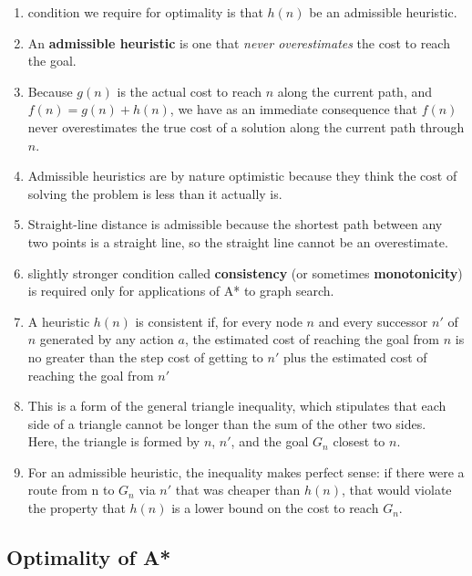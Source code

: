 \begin{enumerate}
    \item condition we require for optimality is that $h(n)$ be an admissible heuristic.

    \item An \textbf{admissible heuristic} is one that \textit{never overestimates} the cost to reach the goal.
    
    \item Because $g(n)$ is the actual cost to reach $n$ along the current path, and $f(n) = g(n) + h(n)$, we have as an immediate consequence that $f(n)$ never overestimates the true cost of a solution along the current path through $n$.

    \item Admissible heuristics are by nature optimistic because they think the cost of solving the problem is less than it actually is.

    \item Straight-line distance is admissible because the shortest path between any two points is a straight line, so the straight line cannot be an overestimate.

    \item slightly stronger condition called \textbf{consistency} (or sometimes \textbf{monotonicity}) is required only for applications of A* to graph search.

    \item A heuristic $h(n)$ is consistent if, for every node $n$ and every successor $n'$ of $n$ generated by any action $a$, the estimated cost of reaching the goal from $n$ is no greater than the step cost of getting to $n'$ plus the estimated cost of reaching the goal from $n'$

    \item This is a form of the general triangle inequality, which stipulates that each side of a triangle cannot be longer than the sum of the other two sides.\\
    Here, the triangle is formed by $n$, $n'$, and the goal $G_n$ closest to $n$. 

    \item For an admissible heuristic, the inequality makes perfect sense: if there were a route from n to $G_n$ via $n'$ that was cheaper than $h(n)$, that would violate the property that $h(n)$ is a lower bound on the cost to reach $G_n$.
\end{enumerate}

\subsection{Optimality of A* \cite{aci-1}}

